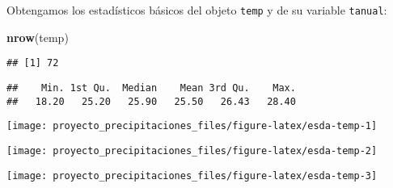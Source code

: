 \documentclass[11pt,]{article}
\newenvironment{Shaded}{\begin{snugshade}}{\end{snugshade}}
\newcommand{\KeywordTok}[1]{\textcolor[rgb]{0.13,0.29,0.53}{\textbf{#1}}}
\newcommand{\OperatorTok}[1]{\textcolor[rgb]{0.81,0.36,0.00}{\textbf{#1}}}
\newcommand{\NormalTok}[1]{#1}
\begin{document}
Obtengamos los estadísticos básicos del objeto \texttt{temp} y de su
variable \texttt{tanual}:

\begin{Shaded}
\begin{Highlighting}[]
\KeywordTok{nrow}\NormalTok{(temp)}
\end{Highlighting}
\end{Shaded}

\begin{verbatim}
## [1] 72
\end{verbatim}

\begin{Shaded}
\end{Shaded}

\begin{verbatim}
##    Min. 1st Qu.  Median    Mean 3rd Qu.    Max. 
##   18.20   25.20   25.90   25.50   26.43   28.40
\end{verbatim}

\begin{Shaded}
\end{Shaded}

\texttt{[image: proyecto\_precipitaciones\_files/figure-latex/esda-temp-1]}

\begin{Shaded}
\end{Shaded}

\texttt{[image: proyecto\_precipitaciones\_files/figure-latex/esda-temp-2]}

\begin{Shaded}
\end{Shaded}

\texttt{[image: proyecto\_precipitaciones\_files/figure-latex/esda-temp-3]}
\end{document}
